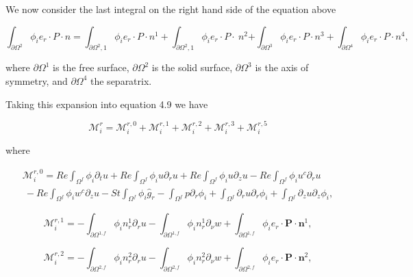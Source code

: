 \documentclass{article}
\begin{document}
We now consider the last integral on the right hand side of the equation above

\begin{equation}
{\int_{\partial\Omega^{2}}\phi_{i}e_{r}\cdot P\cdot n=\int_{\partial\Omega^{2},1}\phi_{i}e_{r}\cdot P\cdot n^{1}+\int_{\partial\Omega^{2},1}\phi_{i}e_{r}\cdot P\cdot\ n^{2}} {+\int_{\partial\Omega^{3}}\phi_{i}e_{r}\cdot P\cdot n^{3}+\int_{\partial\Omega^{4}}\phi_{i}e_{r}\cdot P\cdot n^{4},} \tag{4.17}
\end{equation}

where \(\partial \Omega^1\) is the free surface, \(\partial \Omega^2\) is the solid surface, \(\partial \Omega^3\) is the axis of symmetry, and \(\partial \Omega^4\) the separatrix.

Taking this expansion into equation 4.9 we have

\begin{equation}
\mathcal{M}_i^r = \mathcal{M}_i^{r,0} + \mathcal{M}_i^{r,1} + \mathcal{M}_i^{r,2} + \mathcal{M}_i^{r,3} + \mathcal{M}_i^{r,5} \tag{4.18}
\end{equation}

where

\begin{equation}
\begin{array}{l}{\mathcal{M}_i^{r,0} = Re\int_{\Omega^f}\phi_i\partial_tu + Re\int_{\Omega^f}\phi_iu\partial_r u + Re\int_{\Omega^f}\phi_iu\partial_z u - Re\int_{\Omega^f}\phi_iu^c\partial_r u}\\ {~ - Re\int_{\Omega^f}\phi_iw^c\partial_z u - St\int_{\Omega^f}\phi_i\hat{g}_r - \int_{\Omega^f}p\partial_r\phi_i + \int_{\Omega^f}\partial_r u\partial_r\phi_i + \int_{\Omega^f}\partial_z u\partial_z\phi_i,} \end{array} \tag{4.19}
\end{equation}

\begin{equation}
\mathcal{M}_{i}^{r,1} = -\int_{\partial \Omega^{1,f}}\phi_{i}n_{r}^{1}\partial_{r}u - \int_{\partial \Omega^{1,f}}\phi_{i}n_{r}^{1}\partial_{\nu}w + \int_{\partial \Omega^{1,f}}\phi_{i}e_{r}\cdot \pmb {P}\cdot \pmb{n}^{1}, \tag{4.20}
\end{equation}

\begin{equation}
\mathcal{M}_{i}^{r,2} = -\int_{\partial \Omega^{2,f}}\phi_{i}n_{r}^{2}\partial_{r}u - \int_{\partial \Omega^{2,f}}\phi_{i}n_{r}^{2}\partial_{\nu}w + \int_{\partial \Omega^{2,f}}\phi_{i}e_{r}\cdot \pmb{P}\cdot \pmb{n}^{2}, \tag{4.21}
\end{equation}
\end{document}
